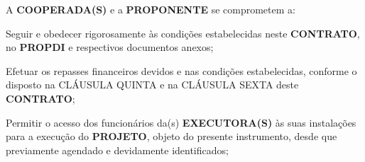 
A \textbf{COOPERADA(S)} e a \textbf{PROPONENTE} se comprometem a:

\xx Seguir e obedecer rigorosamente às condições estabelecidas neste \textbf{CONTRATO}, no \textbf{PROPDI} e respectivos documentos anexos;

\xx Efetuar os repasses financeiros devidos e nas condições estabelecidas, conforme o disposto na CLÁUSULA QUINTA e na CLÁUSULA SEXTA deste \textbf{CONTRATO};

\xx Permitir o acesso dos funcionários da(s) \textbf{EXECUTORA(S)} às suas instalações para a execução do \textbf{PROJETO}, objeto do presente instrumento, desde que previamente agendado e devidamente identificados;
